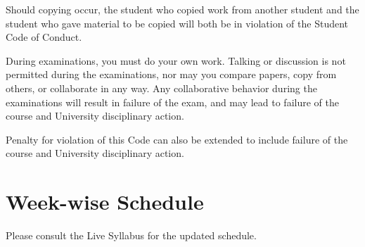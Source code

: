 \documentclass[a4paper]{article}
\begin{document}
Should copying occur, the student who copied work from another student and the student who gave material to be copied will both be in violation of the Student Code of Conduct. 

During examinations, you must do your own work. Talking or discussion is not permitted during the examinations, nor may you compare papers, copy from others, or collaborate in any way. Any collaborative behavior during the examinations will result in failure of the exam, and may lead to failure of the course and University disciplinary action.

Penalty for violation of this Code can also be extended to include failure of the course and University disciplinary action. 

\section{Week-wise Schedule}

Please consult the Live Syllabus for the updated schedule.
\end{document}
